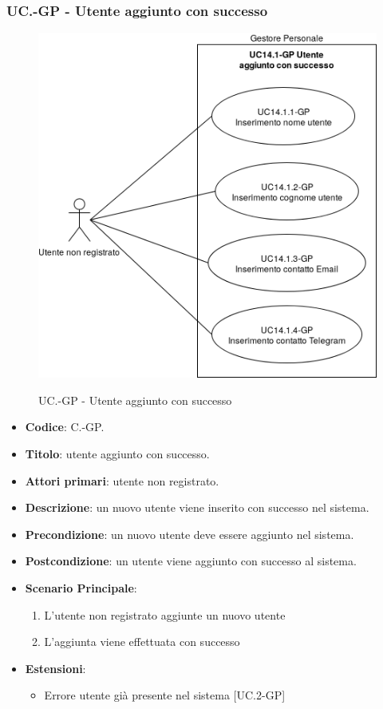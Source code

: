	\subsubsection{UC\theuccount.\thesubuccount-GP - Utente aggiunto con successo}
		\begin{figure}[H]
			\centering
			\includegraphics[width=\columnwidth]{img/casi_d'uso/UC14_1.png}\\
			\caption{UC\theuccount.\thesubuccount-GP - Utente aggiunto con successo}
		\end{figure}
		\begin{itemize}
			\item \textbf{Codice}: C\theuccount.\thesubuccount-GP.
			\item \textbf{Titolo}: utente aggiunto con successo.
			\item \textbf{Attori primari}: utente non registrato.
			\item \textbf{Descrizione}: un nuovo utente viene inserito con successo nel sistema.
			\item \textbf{Precondizione}: un nuovo utente deve essere aggiunto nel sistema.
			\item \textbf{Postcondizione}: un utente viene aggiunto con successo al sistema.
			\item \textbf{Scenario Principale}:
			\begin{enumerate}
				\item L'utente non registrato aggiunte un nuovo utente
				\item L'aggiunta viene effettuata con successo
			\end{enumerate}
			\item \textbf{Estensioni}:
			\begin{itemize}
				\item Errore utente già presente nel sistema [UC\theuccount.2-GP]
			\end{itemize}
		\end{itemize}
		
